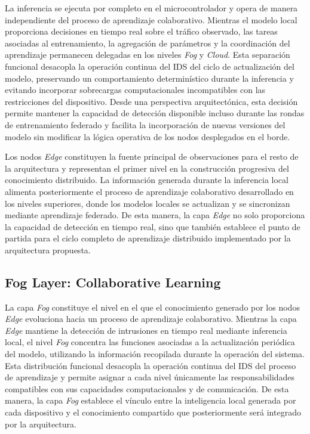 \documentclass[journal,article,submit,moreauthors]{Definitions/mdpi}
\begin{document}
La inferencia se ejecuta por completo en el microcontrolador y opera de manera independiente del proceso de aprendizaje colaborativo. Mientras el modelo local proporciona decisiones en tiempo real sobre el tráfico observado, las tareas asociadas al entrenamiento, la agregación de parámetros y la coordinación del aprendizaje permanecen delegadas en los niveles \textit{Fog} y \textit{Cloud}. Esta separación funcional desacopla la operación continua del IDS del ciclo de actualización del modelo, preservando un comportamiento determinístico durante la inferencia y evitando incorporar sobrecargas computacionales incompatibles con las restricciones del dispositivo. Desde una perspectiva arquitectónica, esta decisión permite mantener la capacidad de detección disponible incluso durante las rondas de entrenamiento federado y facilita la incorporación de nuevas versiones del modelo sin modificar la lógica operativa de los nodos desplegados en el borde.
%

Los nodos \textit{Edge} constituyen la fuente principal de observaciones para el resto de la arquitectura y representan el primer nivel en la construcción progresiva del conocimiento distribuido. La información generada durante la inferencia local alimenta posteriormente el proceso de aprendizaje colaborativo desarrollado en los niveles superiores, donde los modelos locales se actualizan y se sincronizan mediante aprendizaje federado. De esta manera, la capa \textit{Edge} no solo proporciona la capacidad de detección en tiempo real, sino que también establece el punto de partida para el ciclo completo de aprendizaje distribuido implementado por la arquitectura propuesta.

\subsection{Fog Layer: Collaborative Learning}
La capa \textit{Fog} constituye el nivel en el que el conocimiento generado por los nodos \textit{Edge} evoluciona hacia un proceso de aprendizaje colaborativo. Mientras la capa \textit{Edge} mantiene la detección de intrusiones en tiempo real mediante inferencia local, el nivel \textit{Fog} concentra las funciones asociadas a la actualización periódica del modelo, utilizando la información recopilada durante la operación del sistema. Esta distribución funcional desacopla la operación continua del IDS del proceso de aprendizaje y permite asignar a cada nivel únicamente las responsabilidades compatibles con sus capacidades computacionales y de comunicación. De esta manera, la capa \textit{Fog} establece el vínculo entre la inteligencia local generada por cada dispositivo y el conocimiento compartido que posteriormente será integrado por la arquitectura.
%
\end{document}
